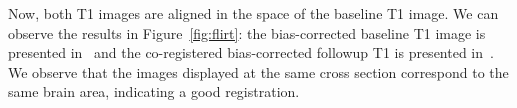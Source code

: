 \gobblepars
\begin{knitrout}
\color{fgcolor}\begin{kframe}
\begin{alltt}
\hlstd{(} \hlstd{=} \hlstd{,}
         \hlstd{=} \hlstd{,}
       \hlstd{=} \hlstd{,}
       \hlstd{=} \hlstd{,}
       \hlstd{=} \hlstd{,}
       \hlstd{=} \hlstd{)}
\end{alltt}
\end{kframe}
\end{knitrout}
\gobblepars


Now, both T1 images are aligned in the space of the baseline T1 image.  We can observe the results in Figure~\ref{fig:flirt}: the bias-corrected baseline T1 image is presented in~\protect{} and the co-registered bias-corrected followup T1 is presented in~\protect{}.   We observe that the images displayed at the same cross section correspond to the same brain area, indicating a good registration.




